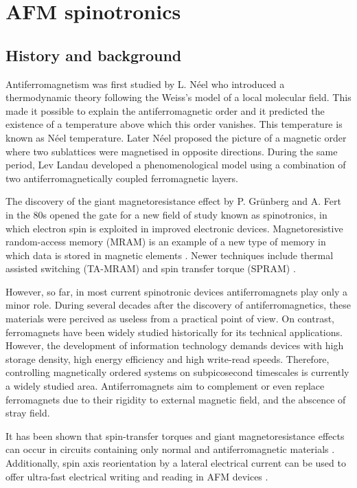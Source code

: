 \chapter{AFM spinotronics}

\section{History and background}

Antiferromagnetism was first studied by L. N\'eel who introduced a thermodynamic theory following the Weiss's model of a local molecular field. This made it possible to explain the antiferromagnetic order and it predicted the existence of a temperature above which this order vanishes. This temperature is known as N\'eel temperature. Later N\'eel proposed the picture of a magnetic order where two sublattices were magnetised in opposite directions. During the same period, Lev Landau developed a phenomenological model using a combination of two antiferromagnetically coupled ferromagnetic layers.

The discovery of the giant magnetoresistance effect by P. Grünberg \cite{Binasch1989} and A. Fert \cite{Baibich1988} in the 80s opened the gate for a new field of study known as spinotronics, in which electron spin is exploited in improved electronic devices. Magnetoresistive random-access memory (MRAM) is an example of a new type of memory in which data is stored in magnetic elements \citep{Akerman2005}. Newer techniques include thermal assisted switching (TA-MRAM) \citep{Bandiera2015} and spin transfer torque (SPRAM) \citep{Kawahara2012}.

However, so far, in most current spinotronic devices antiferromagnets play only a minor role. During several decades after the discovery of antiferromagnetics, these materials were percived as useless from a practical point of view. On contrast, ferromagnets have been widely studied historically for its technical applications. However, the development of information technology demands devices with high storage density, high energy efficiency and high write-read speeds. Therefore, controlling magnetically ordered systems on subpicosecond timescales is currently a widely studied area. Antiferromagnets aim to complement or even replace ferromagnets due to their rigidity to external magnetic field, and the abscence of stray field.

It has been shown that spin-transfer torques and giant magnetoresistance effects can occur in circuits containing only normal and antiferromagnetic materials \cite{MacDonald2011}. Additionally, spin axis reorientation by a lateral electrical current can be used to offer ultra-fast electrical writing and reading in AFM devices \cite{Zelezny2014}.

